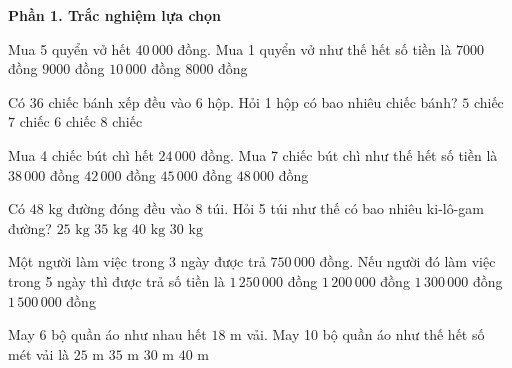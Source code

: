\textbf{Phần 1. Trắc nghiệm lựa chọn}

\begin{ex} %
Mua 5 quyển vở hết $40\,000$ đồng. Mua 1 quyển vở như thế hết số tiền là
\choice
{$7000$ đồng}
{$9000$ đồng}
{$10\,000$ đồng}
{\True $8000$ đồng}
\end{ex}

\begin{ex} %
Có $36$ chiếc bánh xếp đều vào 6 hộp. Hỏi 1 hộp có bao nhiêu chiếc bánh?
\choice
{$5$ chiếc}
{$7$ chiếc}
{\True $6$ chiếc}
{$8$ chiếc}
\end{ex}

\begin{ex} %
Mua 4 chiếc bút chì hết $24\,000$ đồng. Mua 7 chiếc bút chì như thế hết số tiền là
\choice
{$38\,000$ đồng}
{\True $42\,000$ đồng}
{$45\,000$ đồng}
{$48\,000$ đồng}
\end{ex}

\begin{ex} %
Có $48\text{ kg}$ đường đóng đều vào 8 túi. Hỏi 5 túi như thế có bao nhiêu ki-lô-gam đường?
\choice
{$25\text{ kg}$}
{$35\text{ kg}$}
{$40\text{ kg}$}
{\True $30\text{ kg}$}
\end{ex}

\begin{ex} %
Một người làm việc trong 3 ngày được trả $750\,000$ đồng. Nếu người đó làm việc trong 5 ngày thì được trả số tiền là
\choice
{\True $1\,250\,000$ đồng}
{$1\,200\,000$ đồng}
{$1\,300\,000$ đồng}
{$1\,500\,000$ đồng}
\end{ex}

\begin{ex} %
May 6 bộ quần áo như nhau hết $18\text{ m}$ vải. May 10 bộ quần áo như thế hết số mét vải là
\choice
{$25\text{ m}$}
{$35\text{ m}$}
{\True $30\text{ m}$}
{$40\text{ m}$}
\end{ex}

